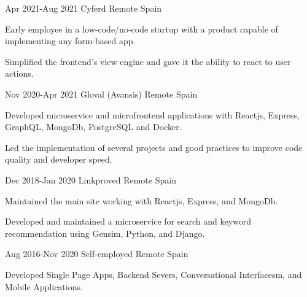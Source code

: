 \documentclass[10pt]{CurriculumVitae}
\begin{document}
      {Apr 2021-Aug 2021}
      {Cyferd}
      {Remote}
      {Spain}
      {
        \item Early employee in a low-code/no-code startup with a product capable of implementing any form-based app.
        \item Simplified the frontend's view engine and gave it the ability to react to user actions.
      }

      {Nov 2020-Apr 2021}
      {Gloval (Avansis)}
      {Remote}
      {Spain}
      {
        \item Developed microservice and microfrontend applications with Reactjs, Express, GraphQL, MongoDb, PostgreSQL and Docker.
        \item Led the implementation of several projects and good practices to improve code quality and developer speed. %
      }

      {Dec 2018-Jan 2020}
      {Linkproved}
      {Remote}
      {Spain}
      {
        \item Maintained the main site working with Reactjs, Express, and MongoDb.
        \item Developed and maintained a microservice for search and keyword recommendation using Gensim, Python, and Django.
      }
 
      {Aug 2016-Nov 2020}
      {Self-employed}
      {Remote}
      {Spain}
      {
        \item Developed Single Page Apps, Backend Severs, Conversational Interfacesm, and Mobile Applications.
      }
   
\end{document}
